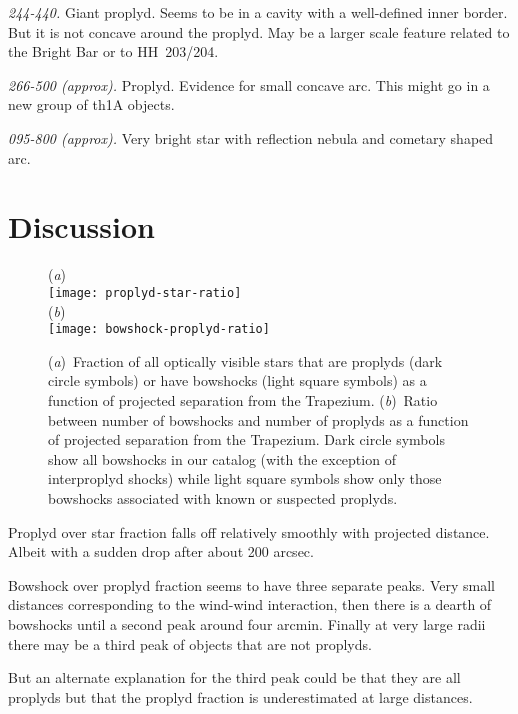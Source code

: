 \documentclass[apj, twocolumn]{aastex63}
\renewcommand\clearpage{}
\begin{document}
\textit{244-440.} Giant proplyd.  Seems to be in a cavity with a
well-defined inner border.  But it is not concave around the proplyd.
May be a larger scale feature related to the Bright Bar or to
HH~203/204.

\textit{266-500 (approx).} Proplyd. Evidence for small concave arc.
This might go in a new group of th1A objects.

\textit{095-800 (approx).} Very bright star with reflection nebula
and cometary shaped arc. 

\label{sec:problematic-group}



\label{sec:notshell}



\clearpage
\section{Discussion}
\label{sec:discuss}
\begin{figure}
  (\textit{a})\\
  \texttt{[image: proplyd-star-ratio]}\\
  (\textit{b})\\
  \texttt{[image: bowshock-proplyd-ratio]}
  \caption{(\textit{a})~Fraction of all optically visible stars that
    are proplyds (dark circle symbols) or have bowshocks (light square
    symbols) as a function of projected separation from the Trapezium.
    (\textit{b})~Ratio between number of bowshocks and number of
    proplyds as a function of projected separation from the Trapezium.
    Dark circle symbols show all bowshocks in our catalog (with the
    exception of interproplyd shocks) while light square symbols show
    only those bowshocks associated with known or suspected proplyds.
  }
  \label{fig:bow-proplyd-star-ratios}
\end{figure}

Proplyd over star fraction falls off relatively smoothly with
projected distance.  Albeit with a sudden drop after about
200 arcsec.


Bowshock over proplyd fraction seems to have three separate peaks.
Very small distances corresponding to the wind-wind interaction,
then there is a dearth of bowshocks until a second peak around
four arcmin.  Finally at very large radii there may be a third
peak of objects that are not proplyds.

But an alternate explanation for the third peak could be that
they are all proplyds but that the proplyd fraction is
underestimated at large distances.
\end{document}
